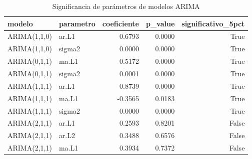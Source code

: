 \begin{table}
\caption{Significancia de parámetros de modelos ARIMA}
\label{tab:significancia_arima}
\begin{tabular}{llrrr}
\toprule
modelo & parametro & coeficiente & p_value & significativo_5pct \\
\midrule
ARIMA(1,1,0) & ar.L1 & 0.6793 & 0.0000 & True \\
ARIMA(1,1,0) & sigma2 & 0.0000 & 0.0000 & True \\
ARIMA(0,1,1) & ma.L1 & 0.5172 & 0.0000 & True \\
ARIMA(0,1,1) & sigma2 & 0.0001 & 0.0000 & True \\
ARIMA(1,1,1) & ar.L1 & 0.8739 & 0.0000 & True \\
ARIMA(1,1,1) & ma.L1 & -0.3565 & 0.0183 & True \\
ARIMA(1,1,1) & sigma2 & 0.0000 & 0.0000 & True \\
ARIMA(2,1,1) & ar.L1 & 0.2593 & 0.8201 & False \\
ARIMA(2,1,1) & ar.L2 & 0.3488 & 0.6576 & False \\
ARIMA(2,1,1) & ma.L1 & 0.3934 & 0.7372 & False \\
\bottomrule
\end{tabular}
\end{table}

